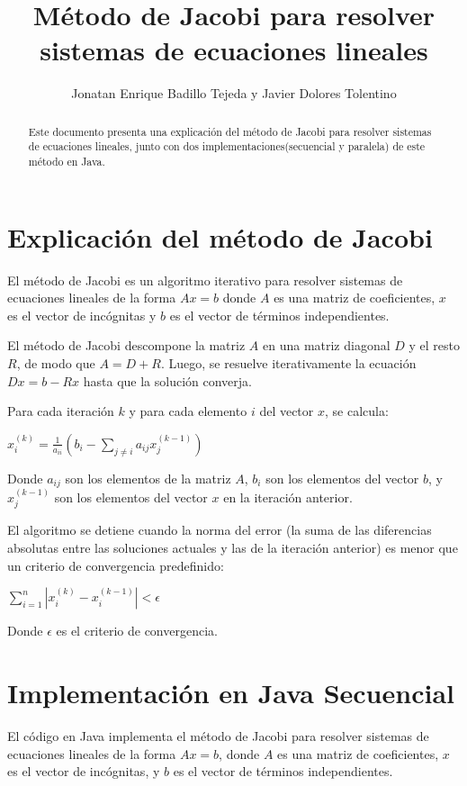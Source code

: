 \documentclass[]{article}
\title{Método de Jacobi para resolver sistemas de ecuaciones lineales}
\author{Jonatan Enrique Badillo Tejeda y Javier Dolores Tolentino}
\begin{document}
\maketitle

\begin{abstract}
Este documento presenta una explicación del método de Jacobi para resolver sistemas de ecuaciones lineales, junto con dos implementaciones(secuencial y paralela) de este método en Java.
\end{abstract}

\section{Explicación del método de Jacobi}

El método de Jacobi es un algoritmo iterativo para resolver sistemas de ecuaciones lineales de la forma $Ax=b$ donde $A$ es una matriz de coeficientes, $x$ es el vector de incógnitas y $b$ es el vector de términos independientes.

El método de Jacobi descompone la matriz $A$ en una matriz diagonal $D$ y el resto $R$, de modo que $A=D+R$. Luego, se resuelve iterativamente la ecuación $Dx=b-Rx$ hasta que la solución converja.

Para cada iteración $k$ y para cada elemento $i$ del vector $x$, se calcula:

$x_i^{(k)} = \frac{1}{a_{ii}} \left( b_i - \sum_{j \neq i} a_{ij} x_j^{(k-1)} \right)$

Donde $a_{ij}$ son los elementos de la matriz $A$, $b_i$ son los elementos del vector $b$, y $x_j^{(k-1)}$ son los elementos del vector $x$ en la iteración anterior.

El algoritmo se detiene cuando la norma del error (la suma de las diferencias absolutas entre las soluciones actuales y las de la iteración anterior) es menor que un criterio de convergencia predefinido:

$\sum_{i=1}^{n} |x_i^{(k)} - x_i^{(k-1)}| < \epsilon$

Donde $\epsilon$ es el criterio de convergencia.

\section{Implementación en Java Secuencial}



El código en Java implementa el método de Jacobi para resolver sistemas de ecuaciones lineales de la forma $Ax = b$, donde $A$ es una matriz de coeficientes, $x$ es el vector de incógnitas, y $b$ es el vector de términos independientes.
\end{document}
